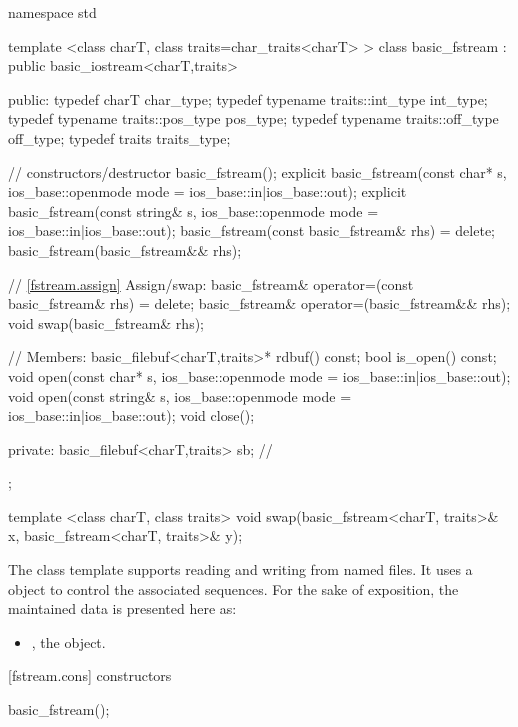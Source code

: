 %
\begin{codeblock}
namespace std {
  template <class charT, class traits=char_traits<charT> >
  class basic_fstream
    : public basic_iostream<charT,traits> {

  public:
    typedef charT                     char_type;
    typedef typename traits::int_type int_type;
    typedef typename traits::pos_type pos_type;
    typedef typename traits::off_type off_type;
    typedef traits                    traits_type;

    // constructors/destructor
    basic_fstream();
    explicit basic_fstream(const char* s,
        ios_base::openmode mode = ios_base::in|ios_base::out);
    explicit basic_fstream(const string& s,
        ios_base::openmode mode = ios_base::in|ios_base::out);
    basic_fstream(const basic_fstream& rhs) = delete;
    basic_fstream(basic_fstream&& rhs);

    // \ref{fstream.assign} Assign/swap:
    basic_fstream& operator=(const basic_fstream& rhs) = delete;
    basic_fstream& operator=(basic_fstream&& rhs);
    void swap(basic_fstream& rhs);

    // Members:
    basic_filebuf<charT,traits>* rdbuf() const;
    bool is_open() const;
    void open(const char* s,
        ios_base::openmode mode = ios_base::in|ios_base::out);
    void open(const string& s,
        ios_base::openmode mode = ios_base::in|ios_base::out);
    void close();

  private:
    basic_filebuf<charT,traits> sb; // \exposr
  };

  template <class charT, class traits>
  void swap(basic_fstream<charT, traits>& x,
            basic_fstream<charT, traits>& y);
}
\end{codeblock}

\pnum
The
class template
supports reading and writing from named files.
It uses a
object to control the associated sequences.
For the sake of exposition, the maintained data is presented here as:
\begin{itemize}
\item
{}, the  object.
\end{itemize}

[fstream.cons]{ constructors}

%
\begin{itemdecl}
basic_fstream();
\end{itemdecl}

